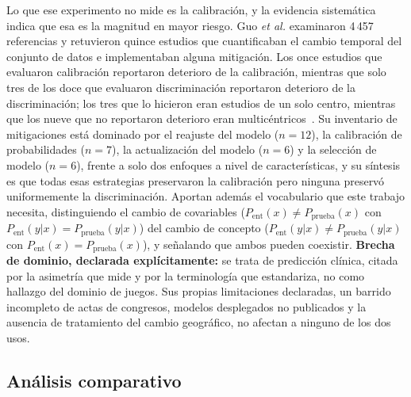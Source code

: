 \documentclass[conference]{IEEEtran}
\begin{document}
Lo que ese experimento no mide es la calibraci\'on, y la evidencia
sistem\'atica indica que esa es la magnitud en mayor riesgo. Guo
\textit{et al.} examinaron 4\,457 referencias y retuvieron quince estudios
que cuantificaban el cambio temporal del conjunto de datos e implementaban
alguna mitigaci\'on. Los once estudios que evaluaron calibraci\'on
reportaron deterioro de la calibraci\'on, mientras que solo tres de los doce
que evaluaron discriminaci\'on reportaron deterioro de la discriminaci\'on;
los tres que lo hicieron eran estudios de un solo centro, mientras que los
nueve que no reportaron deterioro eran
multic\'entricos~\cite{guo_temporalshift_2021}. Su inventario de
mitigaciones est\'a dominado por el reajuste del modelo ($n=12$), la
calibraci\'on de probabilidades ($n=7$), la actualizaci\'on del modelo
($n=6$) y la selecci\'on de modelo ($n=6$), frente a solo dos enfoques a
nivel de caracter\'isticas, y su s\'intesis es que todas esas estrategias
preservaron la calibraci\'on pero ninguna preserv\'o uniformemente la
discriminaci\'on. Aportan adem\'as el vocabulario que este trabajo
necesita, distinguiendo el cambio de covariables
($P_{\text{ent}}(x)\neq P_{\text{prueba}}(x)$ con
$P_{\text{ent}}(y|x)=P_{\text{prueba}}(y|x)$) del cambio de concepto
($P_{\text{ent}}(y|x)\neq P_{\text{prueba}}(y|x)$ con
$P_{\text{ent}}(x)=P_{\text{prueba}}(x)$), y se\~nalando que ambos pueden
coexistir. \textbf{Brecha de dominio, declarada expl\'icitamente:} se trata
de predicci\'on cl\'inica, citada por la asimetr\'ia que mide y por la
terminolog\'ia que estandariza, no como hallazgo del dominio de juegos. Sus
propias limitaciones declaradas, un barrido incompleto de actas de
congresos, modelos desplegados no publicados y la ausencia de tratamiento
del cambio geogr\'afico, no afectan a ninguno de los dos usos.

\subsection{An\'alisis comparativo}
\label{subsec:comparative}

\end{document}
